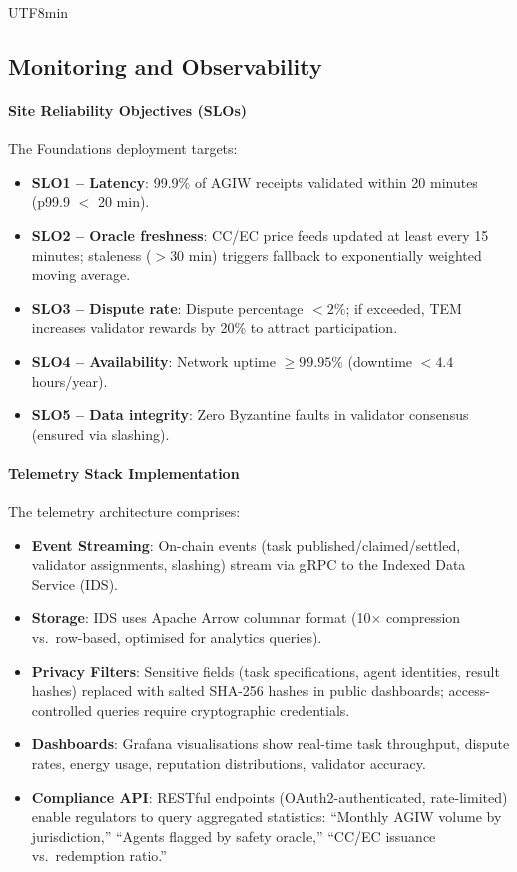 \documentclass[11pt]{article}
\begin{document}
\begin{CJK}{UTF8}{min}
\subsection{Monitoring and Observability}
\paragraph{Site Reliability Objectives (SLOs)} The Foundations deployment targets:
\begin{itemize}[noitemsep]
  \item \textbf{SLO1 -- Latency}: 99.9\% of AGIW receipts validated within 20 minutes (p99.9 $<$ 20 min).
  \item \textbf{SLO2 -- Oracle freshness}: CC/EC price feeds updated at least every 15 minutes; staleness ($>30$ min) triggers fallback to exponentially weighted moving average.
  \item \textbf{SLO3 -- Dispute rate}: Dispute percentage $<2\%$; if exceeded, TEM increases validator rewards by 20\% to attract participation.
  \item \textbf{SLO4 -- Availability}: Network uptime $\geq 99.95\%$ (downtime $<4.4$ hours/year).
  \item \textbf{SLO5 -- Data integrity}: Zero Byzantine faults in validator consensus (ensured via slashing).
\end{itemize}

\paragraph{Telemetry Stack Implementation} The telemetry architecture comprises:
\begin{itemize}[noitemsep]
  \item \textbf{Event Streaming}: On-chain events (task published/claimed/settled, validator assignments, slashing) stream via gRPC to the Indexed Data Service (IDS).
  \item \textbf{Storage}: IDS uses Apache Arrow columnar format (10$\times$ compression vs.\ row-based, optimised for analytics queries).
  \item \textbf{Privacy Filters}: Sensitive fields (task specifications, agent identities, result hashes) replaced with salted SHA-256 hashes in public dashboards; access-controlled queries require cryptographic credentials.
  \item \textbf{Dashboards}: Grafana visualisations show real-time task throughput, dispute rates, energy usage, reputation distributions, validator accuracy.
  \item \textbf{Compliance API}: RESTful endpoints (OAuth2-authenticated, rate-limited) enable regulators to query aggregated statistics: ``Monthly AGIW volume by jurisdiction,'' ``Agents flagged by safety oracle,'' ``CC/EC issuance vs.\ redemption ratio.''
\end{itemize}


\end{CJK}
\end{document}
